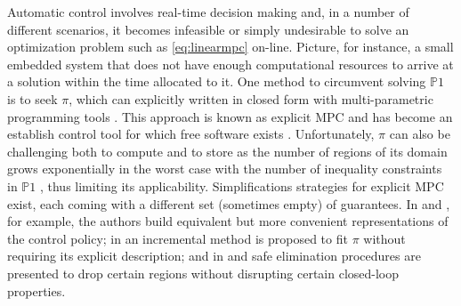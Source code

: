 Automatic control involves real-time decision making and, in a number of different scenarios, it becomes infeasible or simply undesirable to solve an optimization problem such as \eqref{eq:linearmpc} on-line. Picture, for instance, a small embedded system that does not have enough computational resources to arrive at a solution within the time allocated to it. One method to circumvent solving $\mathds{P}1$ is to seek $\pi$, which can explicitly written in closed form with multi-parametric programming tools \citep{bemporad2002explicit}. This approach is known as explicit MPC and has become an establish control tool \citep{mariethoz2008explicit,naus2010design} for which free software exists \citep{herceg2013multi}. Unfortunately, $\pi$ can also be challenging both to compute and to store as the number of regions of its domain grows exponentially in the worst case with the number of inequality constraints in $\mathds{P}1$ \citep{alessio2009survey}, thus limiting its applicability. Simplifications strategies for explicit MPC exist, each coming with a different set (sometimes empty) of guarantees. In \cite{geyer2008optimal} and \cite{wen2009analytical}, for example, the authors build equivalent but more convenient representations of the control policy; in \cite{jones2008double} an incremental method is proposed to fit $\pi$ without requiring its explicit description; and in \cite{christophersen2007controller} and \cite{maddalena2019robust} safe elimination procedures are presented to drop certain regions without disrupting certain closed-loop properties.


